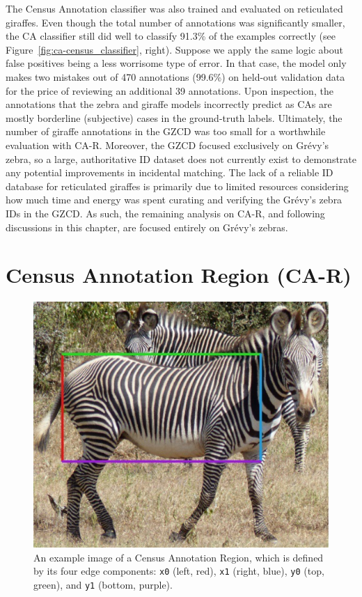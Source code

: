 The Census Annotation classifier was also trained and evaluated on reticulated giraffes.  Even though the total number of annotations was significantly smaller, the CA classifier still did well to classify 91.3\% of the examples correctly (see Figure~\ref{fig:ca-census_classifier}, right).  Suppose we apply the same logic about false positives being a less worrisome type of error. In that case, the model only makes two mistakes out of 470 annotations (99.6\%) on held-out validation data for the price of reviewing an additional 39 annotations.  Upon inspection, the annotations that the zebra and giraffe models incorrectly predict as CAs are mostly borderline (subjective) cases in the ground-truth labels.  Ultimately, the number of giraffe annotations in the GZCD was too small for a worthwhile evaluation with CA-R.  Moreover, the GZCD focused exclusively on Gr\'evy's zebra, so a large, authoritative ID dataset does not currently exist to demonstrate any potential improvements in incidental matching.  The lack of a reliable ID database for reticulated giraffes is primarily due to limited resources considering how much time and energy was spent curating and verifying the Gr\'evy's zebra IDs in the GZCD.  As such, the remaining analysis on CA-R, and following discussions in this chapter, are focused entirely on Gr\'evy's zebras.

\section{Census Annotation Region (CA-R)}

\begin{figure}[!t]
    \begin{center}
        \includegraphics[width=0.70\linewidth]{resources/ca-canonical-regression-iou-68-aid-4651.pdf}
    \end{center}
    \caption{An example image of a Census Annotation Region, which is defined by its four edge components: \texttt{x0} (left, red), \texttt{x1} (right, blue), \texttt{y0} (top, green), and \texttt{y1} (bottom, purple).}
    \label{fig:ca-edges}
\end{figure}

